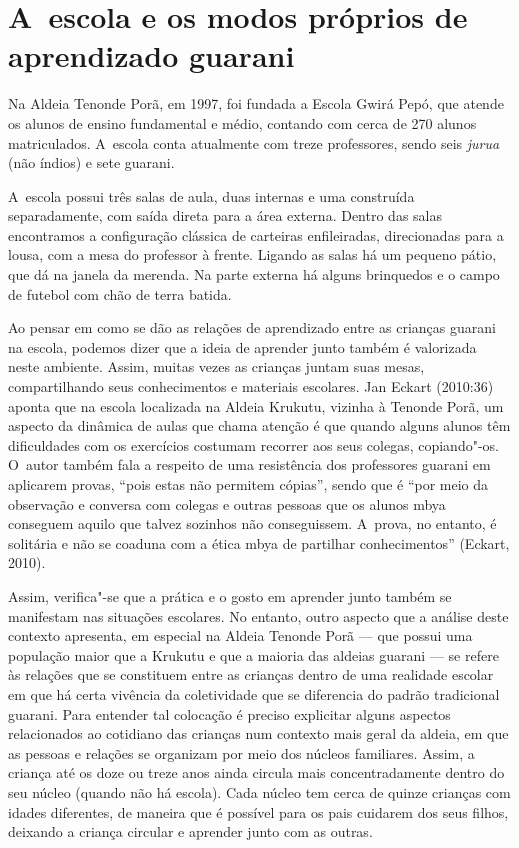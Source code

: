 \section{A~escola e os modos próprios de aprendizado guarani}

Na Aldeia Tenonde Porã, em 1997, foi fundada a Escola Gwirá Pepó, que
atende os alunos de ensino fundamental e médio, contando com cerca de
270 alunos matriculados. A~escola conta atualmente com treze
professores, sendo seis \emph{jurua} (não índios) e sete guarani.

A~escola possui três salas de aula, duas internas e uma construída
separadamente, com saída direta para a área externa. Dentro das salas
encontramos a configuração clássica de carteiras enfileiradas,
direcionadas para a lousa, com a mesa do professor à frente. Ligando as
salas há um pequeno pátio, que dá na janela da merenda. Na parte
externa há alguns brinquedos e o campo de futebol com chão de terra
batida. 

Ao pensar em como se dão as relações de aprendizado entre as crianças
guarani na escola, podemos dizer que a ideia de aprender junto também é
valorizada neste ambiente. Assim, muitas vezes as crianças juntam suas
mesas, compartilhando seus conhecimentos e materiais escolares. Jan
Eckart (2010:36) aponta que na escola localizada na Aldeia Krukutu,
vizinha à Tenonde Porã, um aspecto da dinâmica de aulas que chama
atenção é que quando alguns alunos têm dificuldades com os exercícios
costumam recorrer aos seus colegas, copiando"-os. O~autor também fala a
respeito de uma resistência dos professores guarani em aplicarem
provas, ``pois estas não permitem cópias'', sendo que é ``por meio da
observação e conversa com colegas e outras pessoas que os alunos mbya
conseguem aquilo que talvez sozinhos não conseguissem. A~prova, no
entanto, é solitária e não se coaduna com a ética mbya de partilhar
conhecimentos'' (Eckart, 2010).

Assim, verifica"-se que a prática e o gosto em aprender junto também se
manifestam nas situações escolares. No entanto, outro aspecto que a
análise deste contexto apresenta, em especial na Aldeia Tenonde Porã ---
que possui uma população maior que a Krukutu e que a maioria das
aldeias guarani --- se refere às relações que se constituem entre as
crianças dentro de uma realidade escolar em que há certa vivência da
coletividade que se diferencia do padrão tradicional guarani. Para
entender tal colocação é preciso explicitar alguns aspectos
relacionados ao cotidiano das crianças num contexto mais geral da
aldeia, em que as pessoas e relações se organizam por meio dos núcleos
familiares. Assim, a criança até os doze ou treze anos ainda circula
mais concentradamente dentro do seu núcleo (quando não há escola). Cada
núcleo tem cerca de quinze crianças com idades diferentes, de maneira
que é possível para os pais cuidarem dos seus filhos, deixando a criança
circular e aprender junto com as outras.

